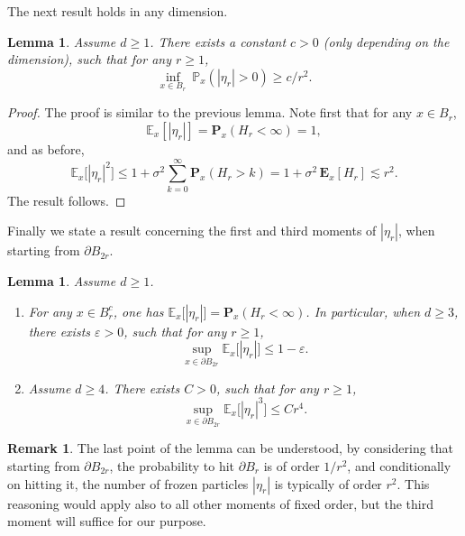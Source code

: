 \documentclass[JEP,XML,SOM,Unicode,NoFloatCountersInSection,published]{cedram}
\theoremstyle{plain}
\newtheorem{lemma}[theorem]{Lemma}
\theoremstyle{definition}
\newtheorem{remark}[theorem]{Remark}
\newcommand{\1}{{\text{\Large $\mathfrak 1$}}}
\begin{document}
The next result holds in any dimension.
\begin{lemma}\label{lem.hit.inside}
Assume $d\ge 1$. There exists a constant $c>0$ (only depending on the dimension), such that for any $r\ge 1$,
\[
\inf_{x\in B_r} \ \mathbb P_x(|\eta_r|>0) \ge c/r^2.
\]
\end{lemma}
\begin{proof}
The proof is similar to the previous lemma.
Note first that for any $x\in B_r$,
\[
\mathbb E_x[|\eta_r|] = \mathbf P_x(H_r<\infty) = 1,
\]
and as before,
\[
\mathbb E_x\big[|\eta_r|^2\big] \le 1 + \sigma^2\sum_{k=0}^\infty \mathbf P_x(H_r>k) = 1+ \sigma^2\, \mathbf E_x[H_r] \lesssim r^2.
\]
The result follows.
\end{proof}

Finally we state a result concerning the first and third moments
of $|\eta_r|$, when starting from $\partial B_{2r}$.
\begin{lemma}\label{lem.mom.etar}
Assume $d\ge 1$.
\begin{enumerate}
\item For any $x\in B_r^c$,
one has $\mathbb E_x\big[|\eta_r|\big] = \mathbf P_x(H_r<\infty)$.
In particular, when $d\ge 3$, there exists
$\varepsilon>0$, such that for any $r\ge 1$,
\[
\sup_{x\in \partial B_{2r}} \mathbb E_x\big[|\eta_r|\big]
\le 1-\varepsilon.
\]
\item Assume $d\ge 4$. There exists $C>0$, such that for any $r\ge 1$,
\[
\sup_{x\in \partial B_{2r}} \mathbb E_x\big[|\eta_r|^3\big] \le Cr^4.
\]
\end{enumerate}
\end{lemma}
\begin{remark}
The last point of the lemma can be understood, by considering that starting from $\partial B_{2r}$, the probability to hit $\partial B_r$ is of order $1/r^2$, and conditionally on hitting it, the number of frozen particles $|\eta_r|$ is typically of order $r^2$. This reasoning would apply also
to all other moments of fixed order, but the third moment will suffice for our purpose.
\end{remark}
\end{document}
